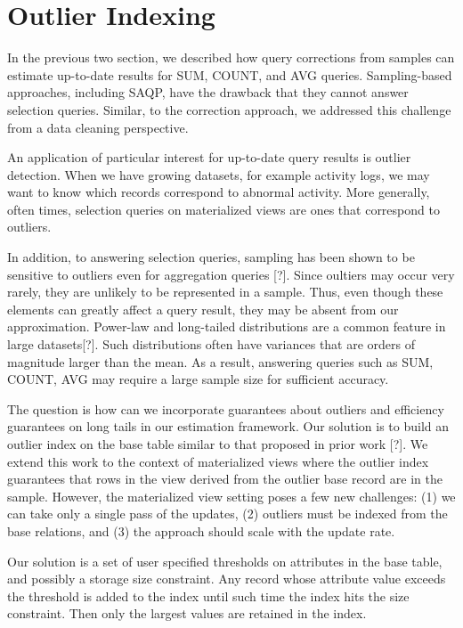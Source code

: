 \section{Outlier Indexing}
In the previous two section, we described how query corrections from samples 
can estimate up-to-date results for SUM, COUNT, and AVG queries.
Sampling-based approaches, including SAQP, have the drawback that they cannot answer selection queries.
Similar, to the correction approach, we addressed this challenge from a data cleaning perspective.

An application of particular interest for up-to-date query results is outlier detection. 
When we have growing datasets, for example activity logs, we may want to know which records correspond to abnormal activity.
More generally, often times, selection queries on materialized views are ones that correspond to outliers.

In addition, to answering selection queries, sampling has been shown to be sensitive to outliers even for aggregation queries [?].
Since oultiers may occur very rarely, they are unlikely to be represented in a sample.
Thus, even though these elements can greatly affect a query result, they may be absent from our approximation.
Power-law and long-tailed distributions are a common feature in large datasets[?].
Such distributions often have variances that are orders of magnitude larger
than the mean.
As a result, answering queries such as SUM, COUNT, AVG may require a large 
sample size for sufficient accuracy.

The question is how can we incorporate guarantees about outliers
and efficiency guarantees on long tails in our estimation framework.
Our solution is to build an outlier index on the base table similar to that proposed in prior work [?].
We extend this work to the context of materialized views where the outlier index guarantees
that rows in the view derived from the outlier base record are in the sample.
However, the materialized view setting poses a few new challenges: (1) we can take only
a single pass of the updates, (2) outliers must be indexed from the base relations, and
(3) the approach should scale with the update rate.

Our solution is a set of user specified thresholds on attributes in the base table, and possibly a storage size constraint.
Any record whose attribute value exceeds the threshold is added to the index until such time the index hits the size constraint.
Then only the largest values are retained in the index.

